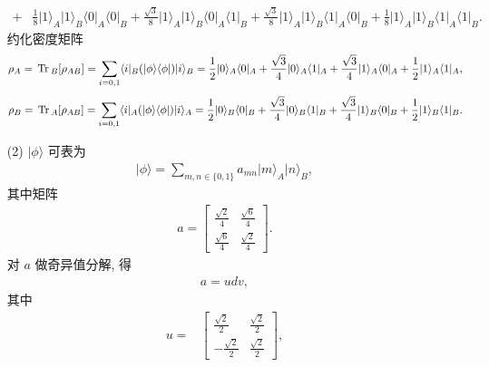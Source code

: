 \documentclass{assignment}
\begin{document}
\begin{sol}
\begin{itemize}
{\begin{align}
            +&\frac{1}{8}\lvert 1\rangle_A\lvert 1\rangle_B\langle 0\rvert_A\langle 0\rvert_B+\frac{\sqrt{3}}{8}\lvert 1\rangle_A\lvert 1\rangle_B\langle 0\rvert_A\langle 1\rvert_B+\frac{\sqrt{3}}{8}\lvert 1\rangle_A\lvert 1\rangle_B\langle 1\rvert_A\langle 0\rvert_B+\frac{1}{8}\lvert 1\rangle_A\lvert 1\rangle_B\langle 1\rvert_A\langle 1\rvert_B.
        \end{align}
        }
        约化密度矩阵
        \begin{align}
            \rho_A=\,\mathrm{Tr}\,_B[\rho_{AB}]=\sum_{i=0,1}\langle i\rvert_B(\lvert\phi\rangle\langle\phi\rvert)\lvert i\rangle_B=\frac{1}{2}\lvert 0\rangle_A\langle 0\rvert_A+\frac{\sqrt{3}}{4}\lvert 0\rangle_A\langle 1\rvert_A+\frac{\sqrt{3}}{4}\lvert 1\rangle_A\langle 0\rvert_A+\frac{1}{2}\lvert 1\rangle_A\langle 1\rvert_A,
        \end{align}
        \begin{align}
            \rho_B=\,\mathrm{Tr}\,_A[\rho_{AB}]=\sum_{i=0,1}\langle i\rvert_A(\lvert\phi\rangle\langle\phi\rvert)\lvert i\rangle_A=\frac{1}{2}\lvert 0\rangle_B\langle 0\rvert_B+\frac{\sqrt{3}}{4}\lvert 0\rangle_B\langle 1\rvert_B+\frac{\sqrt{3}}{4}\lvert 1\rangle_B\langle 0\rvert_B+\frac{1}{2}\lvert 1\rangle_B\langle 1\rvert_B.
        \end{align}
        \item[(2)] $\lvert\phi\rangle$ 可表为
        \begin{align}
            \lvert\phi\rangle=\sum_{m,n\in\{0,1\}}a_{mn}\lvert m\rangle_A\lvert n\rangle_B,
        \end{align}
        其中矩阵
        \begin{align}
            a=\begin{bmatrix}
                \frac{\sqrt{2}}{4}&\frac{\sqrt{6}}{4}\\
                \frac{\sqrt{6}}{4}&\frac{\sqrt{2}}{4}
            \end{bmatrix}.
        \end{align}
        对 $a$ 做奇异值分解, 得
        \begin{align}
            a=udv,
        \end{align}
        其中
        \begin{align}
            u=&\begin{bmatrix}
                \frac{\sqrt{2}}{2}&\frac{\sqrt{2}}{2}\\
                -\frac{\sqrt{2}}{2}&\frac{\sqrt{2}}{2}
            \end{bmatrix},\\

\end{align}
\end{itemize}
\end{sol}
\end{document}
